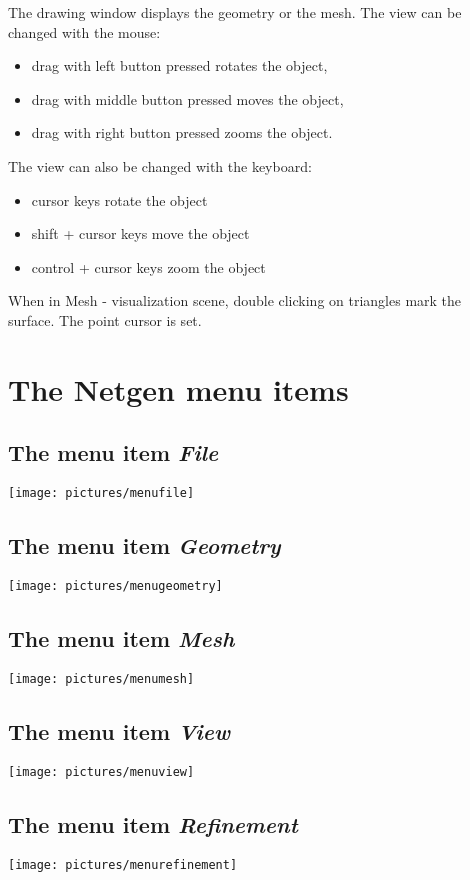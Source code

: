 \documentclass[12pt]{book}
\begin{document}
The drawing window displays the geometry or the mesh. The view
can be changed with the mouse:
\begin{itemize}
\item drag with left button pressed rotates the object,
\item drag with middle button pressed moves the object,
\item drag with right button pressed zooms the object.
\end{itemize}
The view can also be changed with the keyboard:
\begin{itemize}
\item cursor keys rotate the object
\item shift + cursor keys move the object
\item control + cursor keys zoom the object
\end{itemize}

When in Mesh - visualization scene, double clicking on triangles mark the
surface. The point cursor is set.

\section{The Netgen menu items}
\label{sec_menuitems}
\subsection{The menu item {\em File}}
\texttt{[image: pictures/menufile]} 

\subsection{The menu item {\em Geometry}}
\texttt{[image: pictures/menugeometry]} 

\subsection{The menu item {\em Mesh}}
\texttt{[image: pictures/menumesh]} 

\subsection{The menu item {\em View}}
\texttt{[image: pictures/menuview]} 

\subsection{The menu item {\em Refinement}}
\texttt{[image: pictures/menurefinement]} 
\end{document}
